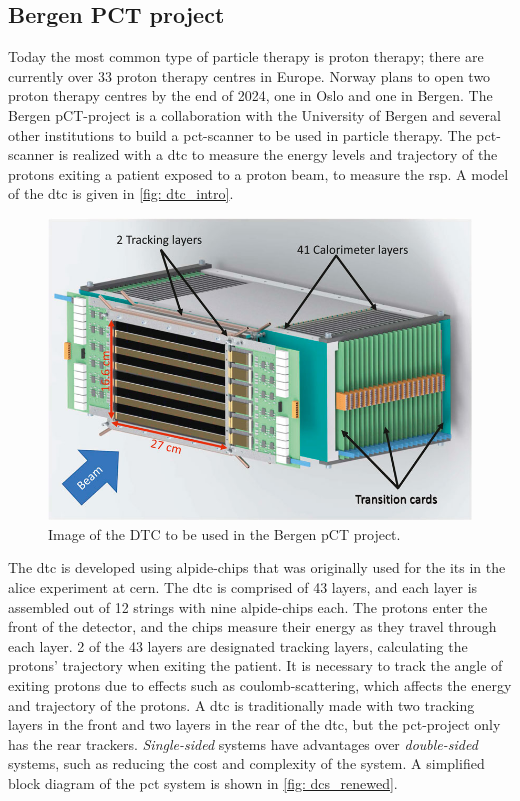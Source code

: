 \documentclass[main.tex]{subfiles}
\begin{document}
\subsection{Bergen PCT project}
Today the most common type of particle therapy is proton therapy; there are currently over 33 proton therapy centres in Europe\cite{proton_centers}. Norway plans to open two proton therapy centres by the end of 2024, one in Oslo and one in Bergen. The Bergen pCT-project is a collaboration with the University of Bergen and several other institutions to build a \gls{pct}-scanner to be used in particle therapy. The \gls{pct}-scanner is realized with a \gls{dtc} to measure the energy levels and trajectory of the protons exiting a patient exposed to a proton beam, to measure the \gls{rsp}. A model of the \gls{dtc} is given in \autoref{fig: dtc_intro}.

\begin{figure}[!ht]
    \centering
    \includegraphics[scale = 0.35]{images/dtc.jpg}
    \caption{Image of the DTC to be used in the Bergen pCT project\cite{pct_project}.}
    \label{fig: dtc_intro}
\end{figure}
\FloatBarrier

The \gls{dtc} is developed using \gls{alpide}-chips that was originally used for the \gls{its} in the \acrshort{alice} experiment at \acrshort{cern}. The \gls{dtc} is comprised of 43 layers, and each layer is assembled out of 12 strings with nine \gls{alpide}-chips each. The protons enter the front of the detector, and the chips measure their energy as they travel through each layer. 2 of the 43 layers are designated tracking layers, calculating the protons' trajectory when exiting the patient. It is necessary to track the angle of exiting protons due to effects such as coulomb-scattering, which affects the energy and trajectory of the protons. A \gls{dtc} is traditionally made with two tracking layers in the front and two layers in the rear of the \gls{dtc}, but the \gls{pct}-project only has the rear trackers. \textit{Single-sided} systems have advantages over \textit{double-sided} systems, such as reducing the cost and complexity of the system. A simplified block diagram of the \gls{pct} system is shown in \autoref{fig: dcs_renewed}.
\end{document}
